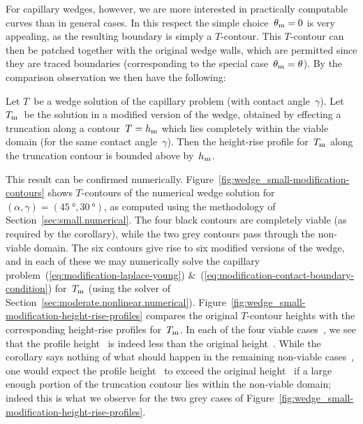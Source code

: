 For capillary wedges, however,
we are more interested in practically computable curves
than in general cases.
In this respect
the simple choice~$\theta_{\mathrm{m}} = 0$ is very appealing,
as the resulting boundary is simply a $T$-contour.
This $T$-contour can then be patched together
with the original wedge walls,
which are permitted since they are traced boundaries
(corresponding to the special case~$\theta_{\mathrm{m}} = \theta$).
By the comparison observation we then have the following:
\begin{corollary*}
  Let $T$~be a wedge solution of the capillary problem
  (with contact angle~$\gamma$).
  Let $T_{\mathrm{m}}$~be the solution in a modified version of the wedge,
  obtained by effecting a truncation along a contour~$T = h_{\mathrm{m}}$
  which lies completely within the viable domain
  (for the same contact angle~$\gamma$).
  Then the height-rise profile for~$T_{\mathrm{m}}$ along the truncation contour
  is bounded above by~$h_{\mathrm{m}}$.
\end{corollary*}
This result can be confirmed numerically.
Figure~\ref{fig:wedge_small-modification-contours}
shows $T$-contours of the numerical wedge solution
for~$(\alpha, \gamma) = (\SI{45}{\degree}, \SI{30}{\degree})$,
as computed using the methodology of Section~\ref{sec:small.numerical}.
The four black contours are completely viable
(as required by the corollary),
while the two grey contours pass through the non-viable domain.
The six contours give rise to six modified versions of the wedge,
and in each of these we may numerically solve
the capillary problem~(\ref{eq:modification-laplace-young})
\&~(\ref{eq:modification-contact-boundary-condition})
for~$T_{\mathrm{m}}$
(using the solver of Section~\ref{sec:moderate.nonlinear.numerical}).
Figure~\ref{fig:wedge_small-modification-height-rise-profiles}
compares the original $T$-contour heights
with the corresponding height-rise profiles for~$T_{\mathrm{m}}$.
In each of the four viable cases~,
we see that the profile height~
is indeed less than the original height~.
While the corollary says nothing of what should happen
in the remaining non-viable cases~,
one would expect the profile height~
to exceed the original height~
if a large enough portion of the truncation contour
lies within the non-viable domain;
indeed this is what we observe
for the two grey cases
of Figure~\ref{fig:wedge_small-modification-height-rise-profiles}.

